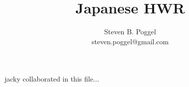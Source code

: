 
\title{Japanese HWR}
\author{Steven B. Poggel\\
steven.poggel@gmail.com}

%

\maketitle




%

%

\thispagestyle{empty}
\tableofcontents

%



%

%

\fontsize{11pt}{13}\selectfont

jacky collaborated in this file...
